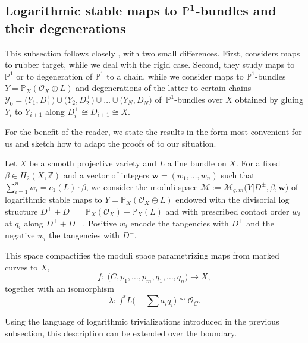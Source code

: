 \documentclass[11pt]{article}
\numberwithin{equation}{section}
\newcommand{\bfw}{ {\boldsymbol w} }
\newcommand{\M}{\mathcal{M}}
\newcommand{\Y}{\mathcal{Y}}
\numberwithin{equation}{section}
\theoremstyle{definition}
\begin{document}
\subsection[Logarithmic stable maps to P\^{}1-bundles and their degenerations]{Logarithmic stable maps to $\boldsymbol{\mathbb P^1}$-bundles and their degenerations}

This subsection follows closely \cite[Section~5]{marcuswiselog}, with two small differences. First, \cite{marcuswiselog} considers maps to rubber target, while we deal with the rigid case. Second, they study maps to $\mathbb{P}^1$ or to degeneration of $\mathbb P^1$ to a chain, while we consider maps to $\mathbb{P}^1$-bundles $Y=\mathbb P_X(\mathcal O_X\oplus L)$ and degenerations of the latter to certain chains $\Y_0=\bigl(Y_1,D_1^\pm\bigr)\cup \bigl(Y_2,D_2^\pm\bigr)\cup\dots\cup\bigl(Y_N,D_N^\pm\bigr)$ of~$\mathbb{P}^1$-bundles over $X$ obtained by gluing $Y_i$ to $Y_{i+1}$ along $D_i^+\cong D_{i+1}^-\cong X$.

For the benefit of the reader, we state the results in the form most convenient for us and sketch how to adapt the proofs of \cite[Section~5]{marcuswiselog} to our situation.

Let $X$ be a smooth projective variety and $L$ a line bundle on $X$.
For a fixed $\beta\in H_2(X,\mathbb Z)$ and a vector of integers $\bfw=(w_1,\dots,w_n)$ such that $\sum_{i=1}^n w_i=c_1(L)\cdot\beta$, we consider the moduli space
$\M := \M_{g,m}\bigl(Y|D^{\pm},\beta,\bfw\bigr)$
of logarithmic stable maps to $Y=\mathbb P_X(\mathcal O_X\oplus L)$ endowed with the divisorial log structure $D^++D^-=\mathbb P_X(\mathcal O_X) +\mathbb P_X(L)$ and with prescribed contact order $w_i$ at $q_i$ along $D^++D^-$ \cite{abramovich2014stable,gross2013logarithmic}.
Positive $w_i$ encode the tangencies with $D^+$ and the negative $w_i$ the tangencies with $D^-$.

This space compactifies the moduli space parametrizing maps from marked curves to $X$,
\[f\colon\ \bigl(C,p_1,\dots, p_m,q_1,\dots,q_n\bigr)\to X,\]
together with an isomorphism
\[\lambda\colon\ f^* L\biggl(-\sum a_i q_i\biggr)\cong\mathcal O_C.\]

Using the language of logarithmic trivializations introduced in the previous subsection, this description can be extended over the boundary.
\end{document}
